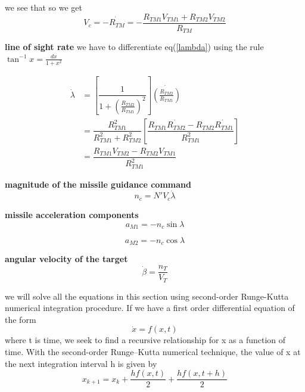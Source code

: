 we see that
so we get 
\begin{equation}
V_c = - \dot{R_{TM}} = - \dfrac{R_{TM1} V_{TM1}+R_{TM2} V_{TM2}}{R_{TM}}
\end{equation}

\textbf{line of sight rate} we have to differentiate eq(\ref{lambda}) using the rule $\tan^{-1}x = \frac{dx}{1+x^2}$ 

\begin{equation}
\begin{split}
\dot{\lambda} &= [\dfrac{1}{1+(\frac{R_{TM2}}{R_{TM1}})^2}] \dot{(\frac{R_{TM2}}{R_{TM1}})}\\
&= \dfrac{R_{TM1}^2}{R_{TM1}^2 + R_{TM2}^2}[\dfrac{R_{TM1}\dot{R_{TM2}}- R_{TM2} \dot{R_{TM1}}}{R_{TM1}^2}]\\
&=\dfrac{R_{TM1} V_{TM2} - R_{TM2} V_{TM1}}{R_{TM1}^2}
\end{split}
\end{equation}

\textbf{magnitude of the missile guidance command}
\begin{equation}
n_c= N' V_c \dot{\lambda}
\end{equation}

\textbf{missile acceleration components}
\begin{equation}
a_{M1} = - n_c \sin \lambda
\end{equation}

\begin{equation}
a_{M2} = - n_c \cos \lambda
\end{equation}

\textbf{angular velocity of the target}
\begin{equation}
\dot{\beta} = \dfrac{n_T}{V_T}
\end{equation}

we will solve all the equations in this section using second-order Runge-Kutta numerical integration procedure. If we have a first order differential equation of the form 
\begin{equation*}
\dot{x} = f(x,t) 
\end{equation*} 
where t is time, we seek to find a recursive relationship for x as a function of time.
With the second-order Runge–Kutta numerical technique, the value of x at the
next integration interval h is given by
\begin{equation*}
x_{k+1} = x_k + \dfrac{hf(x,t)}{2} + \dfrac{h f(x, t+h)}{2}
\end{equation*}


